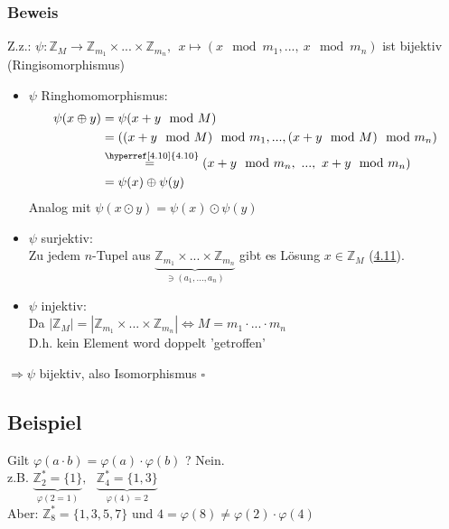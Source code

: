 \documentclass[12pt,titlepage, pdf]{article}
\newcommand{\qed}{\hfill$\square$}
\renewcommand{\>}{\rightarrow}
\renewcommand{\*}{\cdot}
\renewcommand{\phi}{\varphi}
\begin{document}
		      	\subsubsection*{Beweis}
		      	Z.z.: $\psi : \mathds{Z}_M \rightarrow \mathds{Z}_{m_1} \times ... \times \mathds{Z}_{m_n},~~ x \mapsto (x \mod m_1,...,~x \mod m_n)$ ist bijektiv (Ringisomorphismus)
		      	\begin{itemize}
		      		\item $\psi$ Ringhomomorphismus:
		      		      \begin{align*}
		      		      	\psi (x \oplus y) & = \psi(x+y \mod M)                                                              \\
		      		      	                  & = ((x+y \mod M) \mod m_1,..., (x+y \mod M) \mod m_n)                            \\
		      		      	                  & \overset{\textrm{\hyperref[4.10]{4.10}}}{=~} (x+y \mod m_n,~..., ~x+y \mod m_n) \\
		      		      	                  & = \psi(x) \oplus \psi(y)                                                        
		      		      \end{align*}
		      		      Analog mit $\psi(x \odot y) = \psi(x) \odot \psi(y)$
		      		\item $\psi$ surjektiv:\\
		      		      Zu jedem $n$-Tupel aus $\underbrace{\mathds{Z}_{m_1} \times ... \times \mathds{Z}_{m_n}}_{\ni(a_1,...,a_n)}$ gibt es Lösung $x \in \mathds{Z}_M$ (\hyperref[4.11]{4.11}).
		      		\item $\psi$ injektiv: \\
		      		      Da $| \mathds{Z}_M| = | \mathds{Z}_{m_1} \times ... \times \mathds{Z}_{m_n}| \Leftrightarrow M = m_1 \cdot ... \cdot m_n$ \\
		      		      D.h. kein Element word doppelt 'getroffen' \\
		      	\end{itemize}
		      	$\Rightarrow \psi$ bijektiv, also Isomorphismus 
		      	\qed
		      	\subsection{Beispiel}
		      	Gilt $\phi (a \cdot b) = \phi(a) \cdot \phi(b)$ ? Nein.\\
		      	z.B. $\underbrace{\mathds{Z}_2^* = \{1\}}_{\phi(2 = 1)},~~~ \underbrace{\mathds{Z}_4^* = \{1,3\}}_{\phi(4)= 2}$\\
		      	Aber: $\mathds{Z}_8^* =\{1,3,5,7\}$ und $4 = \phi(8) \neq \phi(2) \cdot \phi(4)$
\end{document}
